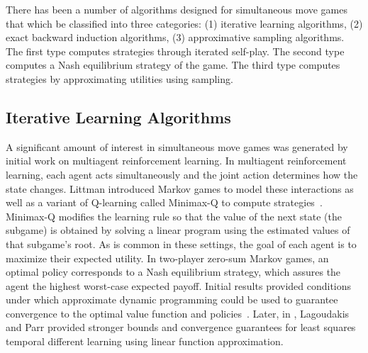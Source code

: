 There has been a number of algorithms designed for simultaneous move games that which be classified into three categories: 
(1) iterative learning algorithms, 
(2) exact backward induction algorithms, 
(3) approximative sampling algorithms.
The first type computes strategies through iterated self-play.
The second type computes a Nash equilibrium strategy of the game. 
The third type computes strategies by approximating utilities using sampling. 

\subsection{Iterative Learning Algorithms}



A significant amount of interest in simultaneous move games was generated by initial work 
on multiagent reinforcement learning. In multiagent reinforcement learning, each agent acts simultaneously and 
the joint action determines how the state changes. Littman introduced Markov games to model these interactions 
as well as a variant of Q-learning called Minimax-Q to compute strategies~\cite{Littman94markovgames,Littman01Value}.
Minimax-Q modifies the learning rule so that the value of the next state (the subgame) is obtained by solving
a linear program using the estimated values of that subgame's root.
As is common in these settings, the goal of each agent is to maximize their expected utility. 
In two-player zero-sum Markov games, an optimal policy corresponds to a Nash equilibrium strategy, which assures the agent 
the highest worst-case expected payoff. Initial results provided conditions under which approximate dynamic 
programming could be used to guarantee convergence to the optimal value function and 
policies~\cite{Littman96ageneralized}. Later, in \cite{Lagoudakis02}, Lagoudakis and Parr provided stronger bounds 
and convergence guarantees for least squares temporal different learning using linear function approximation. 

